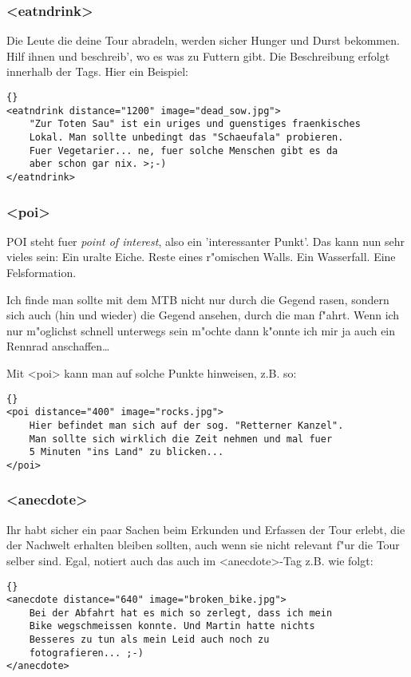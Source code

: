 \subsubsection{<eatndrink>}
Die Leute die deine Tour abradeln, werden sicher Hunger und
Durst bekommen. Hilf ihnen und beschreib', wo es was zu
Futtern gibt. Die Beschreibung erfolgt innerhalb der Tags. Hier 
ein Beispiel:
\begin{lstlisting}{}
<eatndrink distance="1200" image="dead_sow.jpg">
    "Zur Toten Sau" ist ein uriges und guenstiges fraenkisches 
    Lokal. Man sollte unbedingt das "Schaeufala" probieren.
    Fuer Vegetarier... ne, fuer solche Menschen gibt es da
    aber schon gar nix. >;-)
</eatndrink>
\end{lstlisting}


\subsubsection{<poi>}
POI steht fuer \textit{point of interest}, also ein 'interessanter
Punkt'. Das kann nun sehr vieles sein: Ein uralte Eiche. Reste eines
r"omischen Walls. Ein Wasserfall. Eine Felsformation.

Ich finde man sollte mit dem MTB nicht nur durch die Gegend rasen,
sondern sich auch (hin und wieder) die Gegend ansehen, durch die man
f"ahrt. Wenn ich nur m"oglichst schnell unterwegs sein m"ochte  dann 
k"onnte ich mir ja auch ein Rennrad anschaffen\ldots 

Mit <poi> kann man auf solche Punkte hinweisen, z.B. so:
\begin{lstlisting}{}
<poi distance="400" image="rocks.jpg">
    Hier befindet man sich auf der sog. "Retterner Kanzel".
    Man sollte sich wirklich die Zeit nehmen und mal fuer
    5 Minuten "ins Land" zu blicken...
</poi>
\end{lstlisting}

\subsubsection{<anecdote>}
Ihr habt sicher ein paar Sachen beim Erkunden und Erfassen
der Tour erlebt, die der Nachwelt erhalten bleiben sollten,
auch wenn sie nicht relevant f"ur die Tour selber sind.
Egal, notiert auch das auch im <anecdote>-Tag z.B. wie
folgt:
\begin{lstlisting}{}
<anecdote distance="640" image="broken_bike.jpg">
    Bei der Abfahrt hat es mich so zerlegt, dass ich mein
    Bike wegschmeissen konnte. Und Martin hatte nichts
    Besseres zu tun als mein Leid auch noch zu 
    fotografieren... ;-)
</anecdote>
\end{lstlisting}



